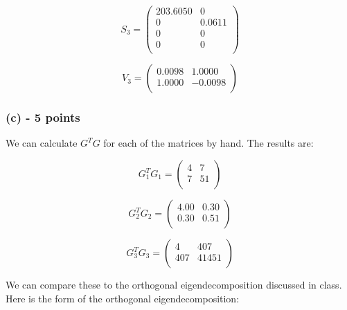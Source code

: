 \documentclass[11pt]{article}
\begin{document}
\begin{equation}
        \nonumber S_3 =
\begin{pmatrix}
  203.6050  &       0 \\
         0  &  0.0611 \\
         0  &       0 \\
         0  &       0 \\
\end{pmatrix}
\end{equation}

\begin{equation}
        \nonumber V_3 =
\begin{pmatrix}
    0.0098  &  1.0000 \\
    1.0000  & -0.0098 \\
\end{pmatrix}
\end{equation}


\subsubsection*{(c) - 5 points}
We can calculate $G^TG$ for each of the matrices by hand.  The results are:

\begin{equation}
        \nonumber G_1^TG_1 =
\begin{pmatrix}
  4  &  7 \\
  7  &  51 \\
\end{pmatrix}
\end{equation}

\begin{equation}
        \nonumber G_2^TG_2 =
\begin{pmatrix}
  4.00 & 0.30 \\
  0.30 & 0.51 \\
\end{pmatrix}
\end{equation}

\begin{equation}
        \nonumber G_3^TG_3 =
\begin{pmatrix}
  4   & 407   \\
  407 & 41451 \\
\end{pmatrix}
\end{equation}

We can compare these to the orthogonal eigendecomposition discussed in class.  Here is the form of the orthogonal eigendecomposition:
\end{document}
